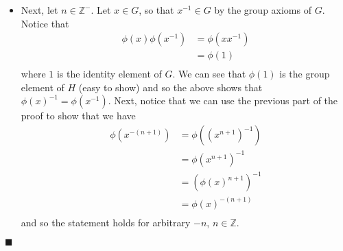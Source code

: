 \documentclass[12pt]{article}
\renewcommand{\qed}{\hfill$\blacksquare$}
\renewenvironment{proof}{\begin{addmargin}[1em]{0em}\begin{newproof}}{\end{newproof}\end{addmargin}\qed}
\begin{document}
\begin{proof}
\begin{itemize}
    \item Next, let $n \in \mathbb{Z}^-$. Let $x\in G$, so that $x^{-1}\in G$ by the group axioms of $G$. Notice that
    \begin{equation*}
        \begin{split}
            \phi\left(x\right)\phi\left(x^{-1}\right) & = \phi \left(xx^{-1}\right) \\
            & = \phi\left(1\right) \\
        \end{split}
    \end{equation*}
    where $1$ is the identity element of $G$. We can see that $\phi\left(1\right)$ is the group element of $H$ (easy to show) and so the above shows that $\phi\left(x\right)^{-1} = \phi\left(x^{-1}\right)$. Next, notice that we can use the previous part of the proof to show that we have
    \begin{equation*}
        \begin{split}
            \phi\left(x^{-\left(n+1\right)}\right) & = \phi\left(\left(x^{n+1}\right)^{-1}\right) \\
            & = \phi\left(x^{n+1}\right)^{-1} \\
            & = \left(\phi\left(x\right)^{n+1}\right)^{-1} \\
            & = \phi\left(x\right)^{-\left(n+1\right)} \\
        \end{split}
    \end{equation*}
    and so the statement holds for arbitrary $-n$, $n\in \mathbb{Z}$.
\end{itemize}
\end{proof}
\end{document}
